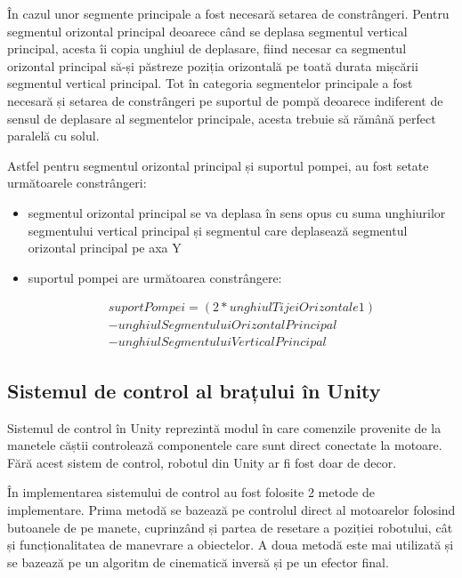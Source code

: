 În cazul unor segmente principale a fost necesară setarea de constrângeri. Pentru segmentul orizontal principal deoarece când se deplasa segmentul vertical principal, acesta îi copia unghiul de deplasare, fiind necesar ca segmentul orizontal principal să-și păstreze poziția orizontală pe toată durata mișcării segmentul vertical principal. 
Tot în categoria segmentelor principale a fost necesară și setarea de constrângeri pe suportul de pompă deoarece indiferent de sensul de deplasare al segmentelor principale, acesta trebuie să rămână perfect paralelă cu solul.

Astfel pentru segmentul orizontal principal și suportul pompei, au fost setate următoarele constrângeri:
\begin{itemize}
	\item segmentul orizontal principal se va deplasa în sens opus cu suma unghiurilor segmentului vertical principal și segmentul care deplasează  segmentul orizontal principal pe axa Y
	\item suportul pompei are următoarea constrângere: 
	
	\begin{equation*}
			\begin{split}
				suportPompei = (2 * unghiulTijeiOrizontale1)  \\
				-unghiulSegmentuluiOrizontalPrincipal \\
				-unghiulSegmentuluiVerticalPrincipal
			\end{split}
	\end{equation*}

\end{itemize}


\subsection{Sistemul de control al brațului în Unity}
Sistemul de control în Unity reprezintă modul în care comenzile provenite de la manetele căștii controlează componentele care sunt direct conectate la motoare. Fără acest sistem de control, robotul din Unity ar fi fost doar de decor.

În implementarea sistemului de control au fost folosite 2 metode de implementare. Prima metodă se bazează pe controlul direct al motoarelor folosind butoanele de pe manete, cuprinzând și partea de resetare a poziției robotului, cât și funcționalitatea de manevrare a obiectelor. A doua metodă este mai utilizată și se bazează pe un algoritm de cinematică inversă și pe un efector final.

